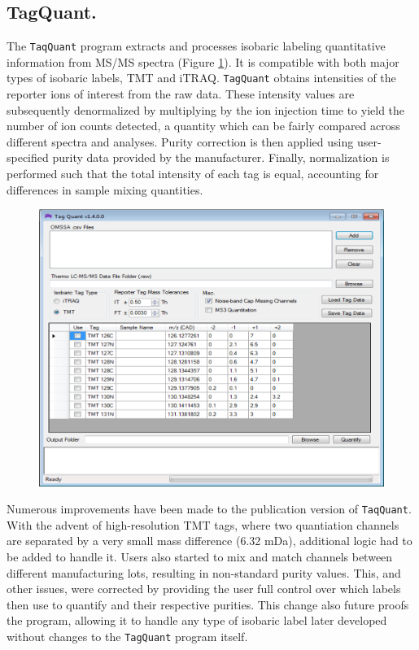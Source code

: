 \subsection*{TagQuant.}
The \texttt{TaqQuant} program extracts and processes isobaric labeling quantitative information from MS/MS spectra (Figure \ref{fig:tagquant}). It is compatible with both major types of isobaric labels, TMT and iTRAQ.\cite{tmt,itraq} \texttt{TagQuant} obtains intensities of the reporter ions of interest from the raw data. These intensity values are subsequently denormalized by multiplying by the ion injection time to yield the number of ion counts detected, a quantity which can be fairly compared across different spectra and analyses. Purity correction is then applied using user-specified purity data provided by the manufacturer.\cite{itracker} Finally, normalization is performed such that the total intensity of each tag is equal, accounting for differences in sample mixing quantities.
\begin{figure}[p]
	\centering
	\includegraphics[width=\columnwidth]{csmsl/tagquant.png}
	\label{fig:tagquant}
\end{figure}

Numerous improvements have been made to the publication version of \texttt{TaqQuant}. With the advent of high-resolution TMT tags, where two quantiation channels are separated by a very small mass difference (6.32 mDa), additional logic had to be added to handle it.\cite{tmt8,tmt82} Users also started to mix and match channels between different manufacturing lots, resulting in non-standard purity values. This, and other issues, were corrected by providing the user full control over which labels then use to quantify and their respective purities. This change also future proofs the program, allowing it to handle any type of isobaric label later developed without changes to the \texttt{TagQuant} program itself.

